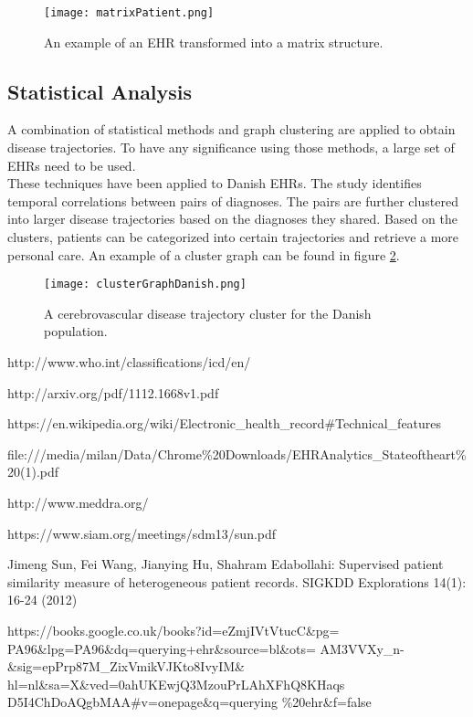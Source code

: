 \begin{figure}[H]
	\centering
	\texttt{[image: matrixPatient.png]}
	\caption{An example of an EHR transformed into a matrix structure.}
	\label{fig:matrixPatient}
\end{figure}


\subsection{Statistical Analysis}

A combination of statistical methods and graph clustering are applied to obtain disease trajectories. To have any significance using those methods, a large set of EHRs need to be used. \\
These techniques have been applied to Danish EHRs. The study identifies temporal correlations between pairs of diagnoses. The pairs are further clustered into larger disease trajectories based on the diagnoses they shared. Based on the clusters, patients can be categorized into certain trajectories and retrieve a more personal care. An example of a cluster graph can be found in figure \ref{fig:clusterGraphDanish}.

\begin{figure}[H]
	\centering
	\texttt{[image: clusterGraphDanish.png]}
	\caption{A cerebrovascular disease trajectory cluster for the Danish population.}
	\label{fig:clusterGraphDanish}
\end{figure}



http://www.who.int/classifications/icd/en/

http://arxiv.org/pdf/1112.1668v1.pdf

https://en.wikipedia.org/wiki/Electronic\_health\_record\#Technical\_features

file:///media/milan/Data/Chrome\%20Downloads/EHRAnalytics\_Stateoftheart\%20(1).pdf

http://www.meddra.org/

https://www.siam.org/meetings/sdm13/sun.pdf

Jimeng Sun, Fei Wang, Jianying Hu, Shahram Edabollahi: Supervised patient similarity measure of
heterogeneous patient records. SIGKDD Explorations 14(1): 16-24 (2012)

https://books.google.co.uk/books?id=eZmjIVtVtucC\&pg=
PA96\&lpg=PA96\&dq=querying+ehr\&source=bl\&ots=
AM3VVXy\_n-\&sig=epPrp87M\_ZixVmikVJKto8IvyIM\&
hl=nl\&sa=X\&ved=0ahUKEwjQ3MzouPrLAhXFhQ8KHaqs
D5I4ChDoAQgbMAA\#v=onepage\&q=querying
\%20ehr\&f=false

